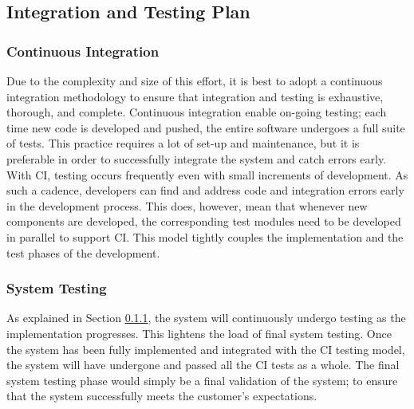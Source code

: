 \subsection{Integration and Testing Plan} \label{sect:ITP}
\subsubsection{Continuous Integration}
\label{sect:CI}
\noindent
Due to the complexity and size of this effort, it is best to adopt a continuous integration methodology to ensure that integration and testing is exhaustive, thorough, and complete. Continuous integration enable on-going testing; each time new code is developed and pushed, the entire software undergoes a full suite of tests. This practice requires a lot of set-up and maintenance, but it is preferable in order to successfully integrate the system and catch errors early.\smallskip\\
\noindent
With CI, testing occurs frequently even with small increments of development. As such a cadence, developers can find and address code and integration errors early in the development process. This does, however, mean that whenever new components are developed, the corresponding test modules need to be developed in parallel to support CI. This model tightly couples the implementation and the test phases of the development.

\subsubsection{System Testing}
As explained in Section \ref{sect:CI}, the system will continuously undergo testing as the implementation progresses. This lightens the load of final system testing. Once the system has been fully implemented and integrated with the CI testing model, the system will have undergone and passed all the CI tests as a whole. The final system testing phase would simply be a final validation of the system; to ensure that the system successfully meets the customer's expectations. 